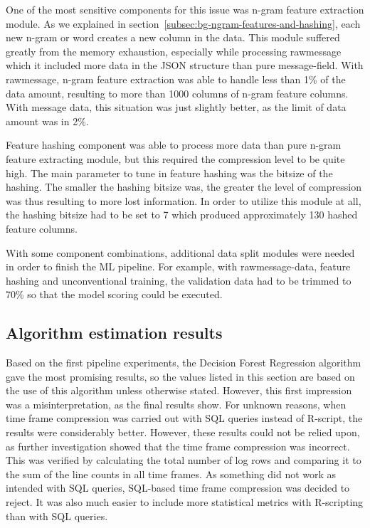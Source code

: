 One of the most sensitive components for this issue
was n-gram feature extraction module.
As we explained in section~\ref{subsec:bg-ngram-features-and-hashing},
each new n-gram or word creates a new column in the data.
This module suffered greatly from the memory exhaustion,
especially while processing rawmessage
which it included more data in the JSON structure than pure message-field.
With rawmessage,
n-gram feature extraction was able to handle
less than 1\% of the data amount,
resulting to more than 1000 columns of n-gram feature columns.
With message data,
this situation was just slightly better,
as the limit of data amount was in 2\%.

Feature hashing component was able to process more data than pure n-gram feature extracting module,
but this required the compression level to be quite high.
The main parameter to tune in feature hashing was the bitsize of the hashing.
The smaller the hashing bitsize was,
the greater the level of compression was thus resulting to more lost information.
In order to utilize this module at all,
the hashing bitsize had to be set to 7
which produced approximately 130 hashed feature columns.

With some component combinations,
additional data split modules were needed
in order to finish the ML pipeline.
For example,
with rawmessage-data, feature hashing and unconventional training,
the validation data had to be trimmed to 70\%
so that the model scoring could be executed.



\subsection{Algorithm estimation results}\label{subsec:res-algorithm-estimation-results}

Based on the first pipeline experiments,
the Decision Forest Regression algorithm gave the most promising results,
so the values listed in this section are based on the use of this algorithm unless otherwise stated.
However, this first impression was a misinterpretation,
as the final results show.
For unknown reasons,
when time frame compression was carried out with SQL queries instead of R-script,
the results were considerably better.
However, these results could not be relied upon,
as further investigation showed that the time frame compression was incorrect.
This was verified by calculating the total number of log rows
and comparing it to the sum of the line counts in all time frames.
As something did not work as intended with SQL queries,
SQL-based time frame compression was decided to reject.
It was also much easier to include more statistical metrics
with R-scripting than with SQL queries.

